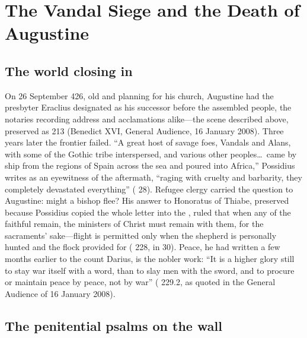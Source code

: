 \section{The Vandal Siege and the Death of Augustine}

\subsection{The world closing in}

On 26 September 426, old and planning for his church, Augustine had the
presbyter Eraclius designated as his successor before the assembled people,
the notaries recording address and acclamations alike---the scene described
above, preserved as  213 (Benedict XVI, General Audience, 16
January 2008). Three years later the frontier
failed. ``A great host of savage foes, Vandals and Alans, with some of the
Gothic tribe interspersed, and various other peoples\ldots\ came by ship
from the regions of Spain across the sea and poured into Africa,'' Possidius
writes as an eyewitness of the aftermath, ``raging with cruelty and
barbarity, they completely devastated everything'' ( 28).
Refugee clergy carried the question to Augustine: might a bishop flee?
His answer to Honoratus of Thiabe, preserved because Possidius copied the
whole letter into the , ruled that when any of the faithful
remain, the ministers of Christ must remain with them, for the sacraments'
sake---flight is permitted only when the shepherd is personally hunted and
the flock provided for ( 228, in  30). Peace, he
had written a few months earlier to the count Darius, is the nobler work:
``It is a higher glory still to stay war itself with a word, than to slay
men with the sword, and to procure or maintain peace by peace, not by war''
( 229.2, as quoted in the General Audience of 16 January
2008).

\subsection{The penitential psalms on the wall}

